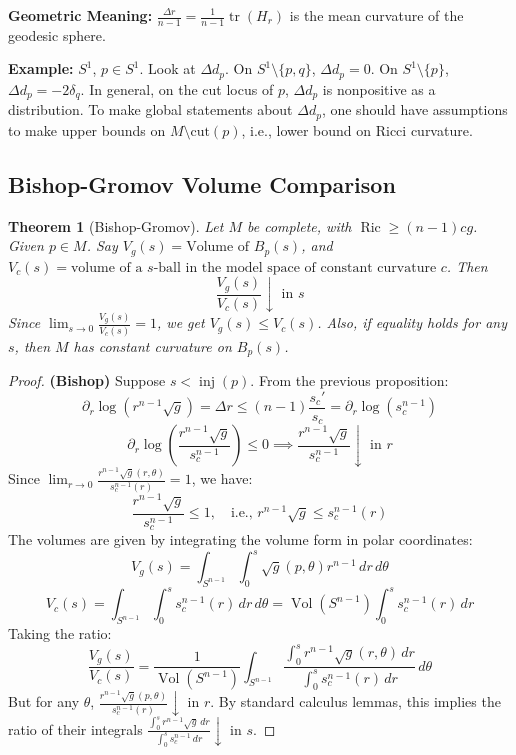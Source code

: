 \documentclass[11pt, a4paper]{article}
\theoremstyle{plain}
\newtheorem{theorem}{Theorem}[section]
\theoremstyle{definition}
\theoremstyle{remark}
\DeclareMathOperator{\tr}{tr}
\DeclareMathOperator{\Ric}{Ric}
\DeclareMathOperator{\Vol}{Vol}
\DeclareMathOperator{\inj}{inj}
\begin{document}
{\textbf{Geometric Meaning:} $\frac{\Delta r}{n-1} = \frac{1}{n-1}\tr(H_r)$ is the mean curvature of the geodesic sphere.

\textbf{Example:} $S^1$, $p \in S^1$. Look at $\Delta d_p$.
On $S^1 \setminus \{p, q\}$, $\Delta d_p = 0$. On $S^1 \setminus \{p\}$, $\Delta d_p = -2\delta_q$.
In general, on the cut locus of $p$, $\Delta d_p$ is nonpositive as a distribution.
To make global statements about $\Delta d_p$, one should have assumptions to make upper bounds on $M \setminus \text{cut}(p)$, i.e., lower bound on Ricci curvature.

\subsection{Bishop-Gromov Volume Comparison}

\begin{theorem}[Bishop-Gromov]
Let $M$ be complete, with $\Ric \ge (n-1)cg$. Given $p \in M$.
Say $V_g(s) = \text{Volume of } B_p(s)$, and $V_c(s) = \text{volume of a } s\text{-ball in the model space of constant curvature } c$. Then 
\[ \frac{V_g(s)}{V_c(s)} \downarrow \text{ in } s \]
Since $\lim_{s \to 0} \frac{V_g(s)}{V_c(s)} = 1$, we get $V_g(s) \le V_c(s)$. Also, if equality holds for any $s$, then $M$ has constant curvature on $B_p(s)$.
\end{theorem}

\begin{proof}
\textbf{(Bishop)} Suppose $s < \inj(p)$.
From the previous proposition:
\[ \partial_r \log(r^{n-1} \sqrt{g}) = \Delta r \le (n-1) \frac{s_c'}{s_c} = \partial_r \log(s_c^{n-1}) \]
\[ \partial_r \log \left( \frac{r^{n-1} \sqrt{g}}{s_c^{n-1}} \right) \le 0 \implies \frac{r^{n-1} \sqrt{g}}{s_c^{n-1}} \downarrow \text{ in } r \]
Since $\lim_{r \to 0} \frac{r^{n-1} \sqrt{g}(r, \theta)}{s_c^{n-1}(r)} = 1$, we have:
\[ \frac{r^{n-1} \sqrt{g}}{s_c^{n-1}} \le 1, \quad \text{i.e., } r^{n-1} \sqrt{g} \le s_c^{n-1}(r) \]
The volumes are given by integrating the volume form in polar coordinates:
\[ V_g(s) = \int_{S^{n-1}} \int_0^s \sqrt{g}(p, \theta) r^{n-1} \, dr \, d\theta \]
\[ V_c(s) = \int_{S^{n-1}} \int_0^s s_c^{n-1}(r) \, dr \, d\theta = \Vol(S^{n-1}) \int_0^s s_c^{n-1}(r) \, dr \]
Taking the ratio:
\[ \frac{V_g(s)}{V_c(s)} = \frac{1}{\Vol(S^{n-1})} \int_{S^{n-1}} \frac{\int_0^s r^{n-1} \sqrt{g}(r,\theta) \, dr}{\int_0^s s_c^{n-1}(r) \, dr} \, d\theta \]
But for any $\theta$, $\frac{r^{n-1} \sqrt{g}(p, \theta)}{s_c^{n-1}(r)} \downarrow$ in $r$. By standard calculus lemmas, this implies the ratio of their integrals $\frac{\int_0^s r^{n-1} \sqrt{g} \, dr}{\int_0^s s_c^{n-1} \, dr} \downarrow$ in $s$.


\end{proof}}
\end{document}
